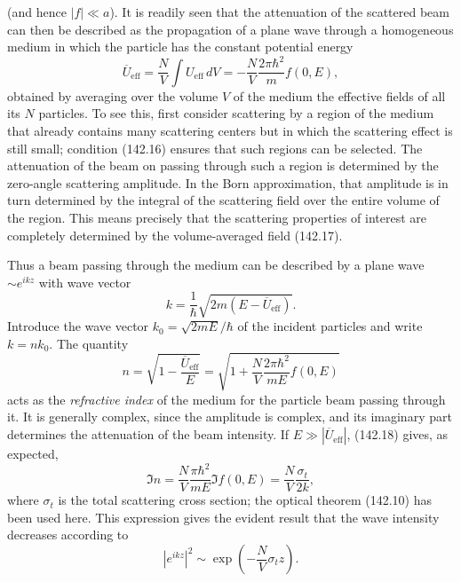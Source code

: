 (and hence $|f|\ll a$). It is readily seen that the attenuation of the scattered beam can then be described as the propagation of a plane wave through a homogeneous medium in which the particle has the constant potential energy
\begin{equation}
 \overline{U}_{\text{eff}}=\frac NV\int U_{\text{eff}}\,dV
 =-\frac NV\frac{2\pi\hbar^2}{m}f(0,E),
 \tag{142.17}
\end{equation}
obtained by averaging over the volume $V$ of the medium the effective fields of all its $N$ particles. To see this, first consider scattering by a region of the medium that already contains many scattering centers but in which the scattering effect is still small; condition (142.16) ensures that such regions can be selected. The attenuation of the beam on passing through such a region is determined by the zero-angle scattering amplitude. In the Born approximation, that amplitude is in turn determined by the integral of the scattering field over the entire volume of the region. This means precisely that the scattering properties of interest are completely determined by the volume-averaged field (142.17).

Thus a beam passing through the medium can be described by a plane wave $\sim e^{ikz}$ with wave vector
\[
 k=\frac1\hbar\sqrt{2m(E-\overline{U}_{\text{eff}})}.
\]
Introduce the wave vector $k_0=\sqrt{2mE}/\hbar$ of the incident particles and write $k=nk_0$. The quantity
\begin{equation}
 n=\sqrt{1-\frac{\overline{U}_{\text{eff}}}{E}}
 =\sqrt{1+\frac NV\frac{2\pi\hbar^2}{mE}f(0,E)}
 \tag{142.18}
\end{equation}
acts as the \emph{refractive index} of the medium for the particle beam passing through it. It is generally complex, since the amplitude is complex, and its imaginary part determines the attenuation of the beam intensity. If $E\gg|\overline{U}_{\text{eff}}|$, (142.18) gives, as expected,
\[
 \Im n=\frac NV\frac{\pi\hbar^2}{mE}\Im f(0,E)=\frac NV\frac{\sigma_t}{2k},
\]
where $\sigma_t$ is the total scattering cross section; the optical theorem (142.10) has been used here. This expression gives the evident result that the wave intensity decreases according to
\[
 |e^{ikz}|^2\sim\exp\left(-\frac NV\sigma_tz\right).
\]

